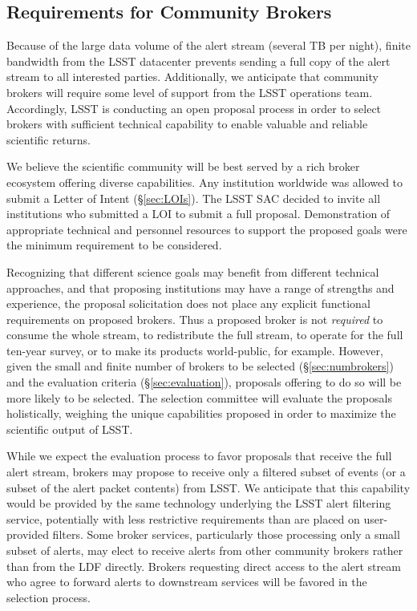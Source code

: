 \subsection{Requirements for Community Brokers}

Because of the large data volume of the alert stream (several TB per night), finite bandwidth from the LSST datacenter prevents sending a full copy of the alert stream to all interested parties.
Additionally, we anticipate that community brokers will require some level of support from the LSST operations team.
Accordingly, LSST is conducting an open proposal process in order to select brokers with sufficient technical capability to enable valuable and reliable scientific returns.

We believe the scientific community will be best served by a rich broker ecosystem offering diverse capabilities.
Any institution worldwide was allowed to submit a Letter of Intent (\S \ref{sec:LOIs}).
The LSST SAC decided to invite all institutions who submitted a LOI to submit a full proposal.
Demonstration of appropriate technical and personnel resources to support the proposed goals were the minimum requirement to be considered.

Recognizing that different science goals may benefit from different technical approaches, and that proposing institutions may have a range of strengths and experience, the proposal solicitation does not place any explicit functional requirements on proposed brokers.
Thus a proposed broker is not \textit{required} to consume the whole stream, to redistribute the full stream, to operate for the full ten-year survey, or to make its products world-public, for example.
However, given the small and finite number of brokers to be selected (\S \ref{sec:numbrokers}) and the evaluation criteria (\S \ref{sec:evaluation}), proposals offering to do so will be more likely to be selected.
The selection committee will evaluate the proposals holistically, weighing the unique capabilities proposed in order to maximize the scientific output of LSST.

While we expect the evaluation process to favor proposals that receive the full alert stream, brokers may propose to receive only a filtered subset of events (or a subset of the alert packet contents) from LSST.
We anticipate that this capability would be provided by the same technology underlying the LSST alert filtering service, potentially with less restrictive requirements than are placed on user-provided filters.
Some broker services, particularly those processing only a small subset of alerts, may elect to receive alerts from other community brokers rather than from the LDF directly.
Brokers requesting direct access to the alert stream who agree to forward alerts to downstream services will be favored in the selection process.

